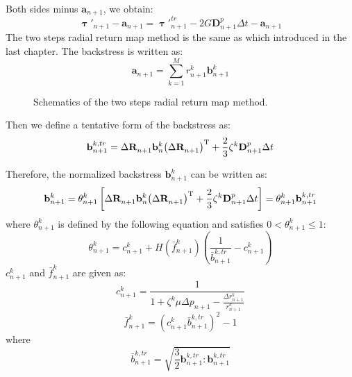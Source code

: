 Both sides minus ${{\mathbf{a}}_{n + 1}}$, we obtain:
\begin{equation}
\label{Equ:sminusa1}
{\bm{\uptau }}'_{n + 1} - {{\mathbf{a}}_{n + 1}} = {{\bm{\uptau }}'}_{n + 1}^{tr} - 2G{\mathbf{D}}_{n + 1}^p \Delta t - {{\mathbf{a}}_{n + 1}}
\end{equation}
The two steps radial return map method is the same as which introduced in the last chapter. The backstress is written as:
\begin{equation}
{{\mathbf{a}}_{n + 1}} = \sum\limits_{k = 1}^M {r_{n + 1}^k{\mathbf{b}}_{n + 1}^k}
\end{equation}
\begin{figure}[!htp]
\centering{}
\caption{Schematics of the two steps radial return map method.}
\label{Fig:radial_return_map}
\end{figure}

Then we define a tentative form of the backstress as:
\begin{equation}
\label{Equ:btrn+1}
{\mathbf{b}}_{n + 1}^{k,tr} = \Delta {\mathbf{R}}_{n + 1}^{}{{\mathbf{b}}_n^k}{\left( {\Delta {\mathbf{R}}_{n + 1}^{}} \right)^{\rm{T}}}  + \frac{2}{3}{\zeta ^k}{\mathbf{D }}_{n + 1}^p \Delta t
\end{equation}

Therefore, the normalized backstress ${\mathbf{b}}_{n + 1}^k$ can be written as:
\begin{equation}
\label{Equ:bn+1}
{\mathbf{b}}_{n + 1}^k = \theta _{n + 1}^k\left[ \Delta {\mathbf{R}}_{n + 1}^{}{{\mathbf{b}}_n^k}{\left( {\Delta {\mathbf{R}}_{n + 1}^{}} \right)^{\rm{T}}}  + \frac{2}{3}{\zeta ^k}{\mathbf{D }}_{n + 1}^p \Delta t \right] = \theta _{n + 1}^k{\mathbf{b}}_{n + 1}^{k,tr}
\end{equation}
where $\theta _{n + 1}^k$ is defined by the following equation and satisfies $0 < \theta _{n + 1}^k \leqslant 1$:
\begin{equation}
\label{Equ:thetan+1}
\theta _{n + 1}^k = c_{n + 1}^k + H\left( {\bar f_{n + 1}^k} \right)\left( {\frac{1}{{\bar b_{n + 1}^{k,tr}}} - c_{n + 1}^k} \right)
\end{equation}
$c_{n + 1}^k$ and ${\bar f_{n + 1}^k}$ are given as:
\begin{equation}
c_{n + 1}^k = \frac{1}{{1 + {\zeta ^k}\mu \Delta {p_{n + 1}} - \frac{{\Delta r_{n + 1}^k}}{{r_{n + 1}^k}}}}
\end{equation}
\begin{equation}
\bar f_{n + 1}^k = {\left( {c_{n + 1}^k\bar b_{n + 1}^{k,tr}} \right)^2} - 1
\end{equation}
where
\begin{equation}
\bar b_{n + 1}^{k,tr} = \sqrt {\frac{3}{2}{\mathbf{b}}_{n + 1}^{k,tr}:{\mathbf{b}}_{n + 1}^{k,tr}}
\end{equation}

